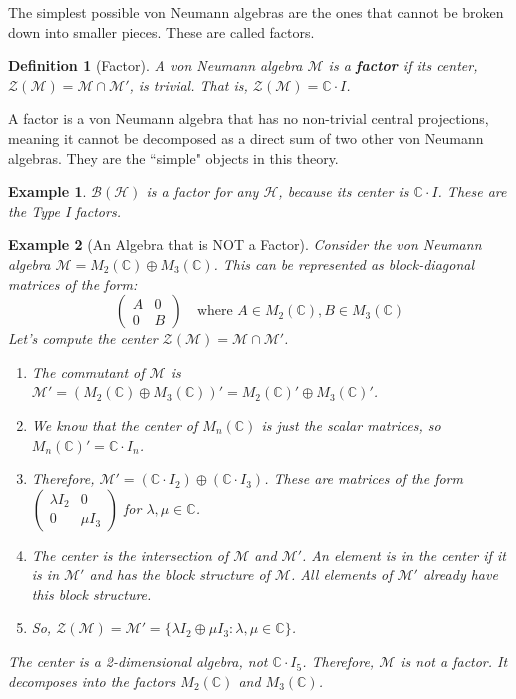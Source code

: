 \documentclass[11pt, a4paper]{article}
\theoremstyle{colored_def}
\newtheorem{definition}{Definition}[section]
\theoremstyle{colored_thm}
\theoremstyle{colored_ex}
\newtheorem{example}{Example}[section]
\newcommand{\C}{\mathbb{C}}
\newcommand{\M}{\mathcal{M}}
\newcommand{\Hil}{\mathcal{H}}
\newcommand{\B}{\mathcal{B}}
\newcommand{\Z}{\mathcal{Z}}
\begin{document}
The simplest possible von Neumann algebras are the ones that cannot be broken down into smaller pieces. These are called factors.

\begin{definition}[Factor]
A von Neumann algebra $\M$ is a \textbf{factor} if its center, $\Z(\M) = \M \cap \M'$, is trivial. That is, $\Z(\M) = \C \cdot I$.
\end{definition}

A factor is a von Neumann algebra that has no non-trivial central projections, meaning it cannot be decomposed as a direct sum of two other von Neumann algebras. They are the ``simple" objects in this theory.

\begin{example}
$\B(\Hil)$ is a factor for any $\Hil$, because its center is $\C \cdot I$. These are the Type I factors.
\end{example}

\begin{example}[An Algebra that is NOT a Factor]\label{ex:not-a-factor}
Consider the von Neumann algebra $\M = M_2(\C) \oplus M_3(\C)$. This can be represented as block-diagonal matrices of the form:
$$ \begin{pmatrix} A & 0 \\ 0 & B \end{pmatrix} \quad \text{where } A \in M_2(\C), B \in M_3(\C) $$
Let's compute the center $\Z(\M) = \M \cap \M'$.
\begin{enumerate}
    \item The commutant of $\M$ is $\M' = (M_2(\C) \oplus M_3(\C))' = M_2(\C)' \oplus M_3(\C)'$.
    \item We know that the center of $M_n(\C)$ is just the scalar matrices, so $M_n(\C)' = \C \cdot I_n$.
    \item Therefore, $\M' = (\C \cdot I_2) \oplus (\C \cdot I_3)$. These are matrices of the form $\begin{pmatrix} \lambda I_2 & 0 \\ 0 & \mu I_3 \end{pmatrix}$ for $\lambda, \mu \in \C$.
    \item The center is the intersection of $\M$ and $\M'$. An element is in the center if it is in $\M'$ and has the block structure of $\M$. All elements of $\M'$ already have this block structure.
    \item So, $\Z(\M) = \M' = \{ \lambda I_2 \oplus \mu I_3 : \lambda, \mu \in \C \}$.
\end{enumerate}
The center is a 2-dimensional algebra, not $\C \cdot I_{5}$. Therefore, $\M$ is not a factor. It decomposes into the factors $M_2(\C)$ and $M_3(\C)$.
\end{example}
\end{document}
